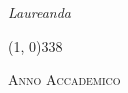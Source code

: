 \begin{titlepage}
\begin{center}
\begin{large}
			\vspace{0pt} 
			
			\begin{flushright}
				\textit{Laureanda}\\ 
				\vspace{5pt} 
				\myName
			\end{flushright}
		\end{large}
		
		\vspace{35pt}
		
		\line(1, 0){338} \\
		\begin{normalsize}
			\textsc{Anno Accademico \myAA}
		\end{normalsize}
		
	\end{center}
\end{titlepage} 